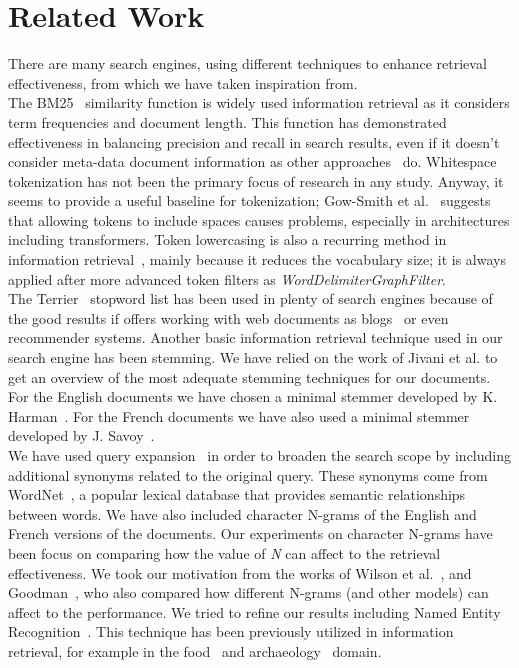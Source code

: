 \section{Related Work}
\label{sec:related}

There are many search engines, using different techniques to enhance retrieval effectiveness, from which we have taken
inspiration from.\\

The BM25~\cite{BM25} similarity function is widely used information retrieval as it considers term frequencies and
document length.
This function has demonstrated effectiveness in balancing precision and recall in search results, even if it
doesn't consider meta-data document information as other approaches~\cite{robertson2009probabilistic} do.
Whitespace tokenization has not been the primary focus of research in any study.
Anyway, it seems to provide a useful baseline for tokenization;
Gow-Smith et al.~\cite{gowsmith2022improving} suggests that allowing tokens to include spaces causes problems,
especially in architectures including transformers.
Token lowercasing is also a recurring method in information retrieval~\cite{manning2008introduction}, mainly because it
reduces the vocabulary size;
it is always applied after more advanced token filters as \textit{WordDelimiterGraphFilter}.\\

The Terrier~\cite{OunisEtAl2006} stopword list has been used in plenty of search engines because of the good results if
offers working with web documents as blogs~\cite{ounis2009overview} or even recommender systems.
Another basic information retrieval technique used in our search engine has been stemming.
We have relied on the work of Jivani et al.\cite{jivani2011comparative} to get an overview of the most adequate stemming
techniques for our documents.
For the English documents we have chosen a minimal stemmer developed by K. Harman~\cite{Harman1991HowEI}.
For the French documents we have also used a minimal stemmer developed by J. Savoy~\cite{frenchStemmer}.\\

We have used query expansion~\cite{efthimiadis1996query} in order to broaden the search scope by including additional
synonyms related to the original query.
These synonyms come from WordNet~\cite{Fellbaum1998}, a popular lexical database that provides semantic relationships
between words.
We have also included character N-grams of the English and French versions of the documents.
Our experiments on character N-grams have been focus on comparing how the value of \textit{N} can affect to the
retrieval effectiveness.
We took our motivation from the works of Wilson et al.~\cite{wilson2008comparing}, and Goodman~\cite{goodman2001bit},
who also compared how different N-grams (and other models) can affect to the performance.
We tried to refine our results including Named Entity Recognition~\cite{mohit2014named}.
This technique has been previously utilized in information retrieval, for example in the food~\cite{popovski2020survey}
and archaeology~\cite{brandsen2022can} domain.\\

